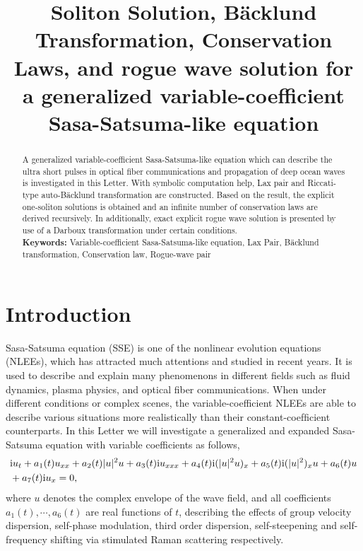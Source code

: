 \documentclass[12pt]{article}
\title{\large\bfseries Soliton Solution, B\"acklund Transformation, Conservation Laws, and rogue wave solution for a generalized variable-coefficient Sasa-Satsuma-like equation}
\author{}
\begin{document}
\maketitle

\begin{abstract}
A generalized variable-coefficient Sasa-Satsuma-like equation which can describe the ultra short pulses in optical fiber communications and propagation of deep ocean waves is investigated in this Letter. With symbolic computation help, Lax pair and Riccati-type auto-B\"acklund transformation are constructed. Based on the result, the explicit one-soliton solutions is obtained and an infinite number of conservation laws are derived recursively. In additionally, exact explicit rogue wave solution is presented by use of a Darboux transformation under certain conditions. \\
\indent\textbf{Keywords:} Variable-coefficient Sasa-Satsuma-like equation, Lax Pair, B\"acklund transformation, Conservation law, Rogue-wave pair
\end{abstract}

\section{Introduction}
Sasa-Satsuma equation (SSE) is one of the nonlinear evolution equations (NLEEs), which has attracted much attentions and studied in recent years. It is used to describe and explain many phenomenons in different fields such as fluid dynamics, plasma physics, and optical fiber communications.\cite{1,2,3,4,5,6,7,8,9} When under different conditions or complex scenes, the variable-coefficient NLEEs are able to describe various situations more realistically than their constant-coefﬁcient counterparts.\cite{8,9} In this Letter we will investigate a generalized and expanded Sasa-Satsuma equation with variable coefficients as follows,
\begin{align}
  & \mathrm{i}u_{t} + a_{1}(t)u_{xx} + a_2(t)|u|^{2}u + a_3(t)\mathrm{i}u_{xxx} + a_{4}(t)\mathrm{i}(|u|^{2}u)_{x} + a_{5}(t)\mathrm{i}(|u|^{2})_{x}u + a_{6}(t)u \notag\\
  & + a_{7}(t)\mathrm{i}u_{x}=0,   \label{1}
\end{align}
where $u$ denotes the complex envelope of the wave field, and all coefficients $a_{1}(t), \cdots, a_{6}(t)$ are real functions of $t$, describing the effects of group velocity dispersion, self-phase modulation, third order dispersion, self-steepening and self-frequency shifting via stimulated Raman scattering respectively.
\end{document}
